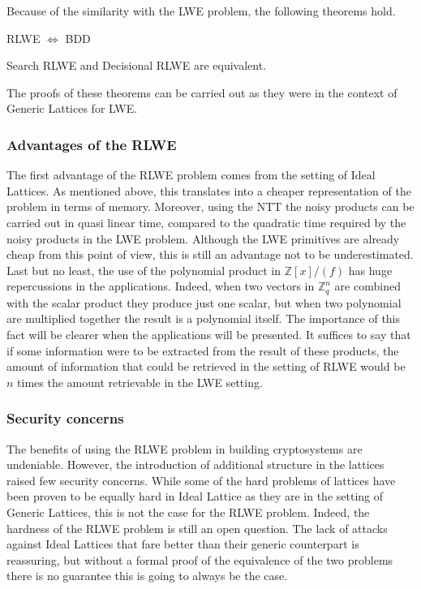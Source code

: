 Because of the similarity with the LWE problem, the following theorems hold.

\begin{theorem}
RLWE $\Leftrightarrow$ BDD
\end{theorem}
\begin{theorem}
Search RLWE and Decisional RLWE are equivalent.
\end{theorem}

The proofs of these theorems can be carried out as they were in the context of Generic Lattices for LWE.\\

\subsubsection{Advantages of the RLWE}
The first advantage of the RLWE problem comes from the setting of Ideal Lattices. As mentioned above, this translates into a cheaper representation of the problem in terms of memory. Moreover, using the NTT the noisy products can be carried out in quasi linear time, compared to the quadratic time required by the noisy products in the LWE problem. Although the LWE primitives are already cheap from this point of view, this is still an advantage not to be underestimated.\\
Last but no least, the use of the polynomial product in $\mathbb{Z}[x]/(f)$ has huge repercussions in the applications. Indeed, when two vectors in $\mathbb{Z}_q^n$ are combined with the scalar product they produce just one scalar, but when two polynomial are multiplied together the result is a polynomial itself. The importance of this fact will be clearer when the applications will be presented. It suffices to say that if some information were to be extracted from the result of these products, the amount of information that could be retrieved in the setting of RLWE would be $n$ times the amount retrievable in the LWE setting.

\subsubsection{Security concerns}
The benefits of using the RLWE problem in building cryptosystems are undeniable. However, the introduction of additional structure in the lattices raised few security concerns. While some of the hard problems of lattices have been proven to be equally hard in Ideal Lattice as they are in the setting of Generic Lattices, this is not the case for the RLWE problem. Indeed, the hardness of the RLWE problem is still an open question. The lack of attacks against Ideal Lattices that fare better than their generic counterpart is reassuring, but without a formal proof of the equivalence of the two problems there is no guarantee this is going to always be the case.

